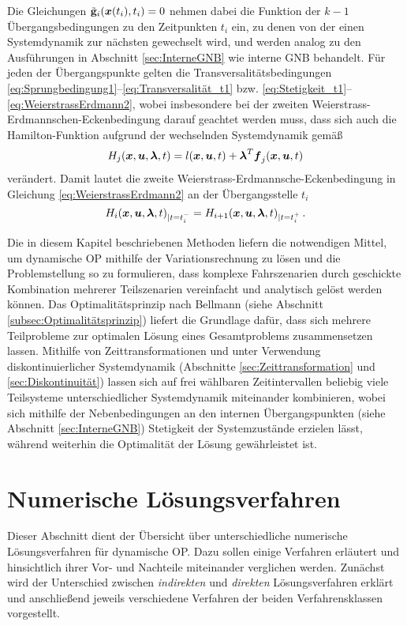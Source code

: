 Die Gleichungen $\tilde{\mathbf{g}}_i(\boldsymbol{x}(t_i),t_i) = 0$ nehmen dabei die Funktion der $k-1$ Übergangsbedingungen zu den Zeitpunkten $t_i$ ein, zu denen von der einen Systemdynamik zur nächsten gewechselt wird, und werden analog zu den Ausführungen in Abschnitt \ref{sec:InterneGNB} wie interne \gls{GNB} behandelt. Für jeden der Übergangspunkte gelten die Transversalitätsbedingungen \eqref{eq:Sprungbedingung1}--\eqref{eq:Transversalität_t1} bzw. \eqref{eq:Stetigkeit_t1}--\eqref{eq:WeierstrassErdmann2}, wobei insbesondere bei der zweiten Weierstrass-Erdmannschen-Eckenbedingung darauf geachtet werden muss, dass sich auch die Hamilton-Funktion aufgrund der wechselnden Systemdynamik gemäß
\begin{equation}
	H_j(\boldsymbol{x},\boldsymbol{u},\boldsymbol{\lambda},t) = l(\boldsymbol{x},\boldsymbol{u},t) + \boldsymbol{\lambda}^T\boldsymbol{f}_j(\boldsymbol{x},\boldsymbol{u},t) \label{eq:Hamilton_j}
\end{equation} 
verändert. Damit lautet die zweite Weierstrass-Erdmannsche-Eckenbedingung in Gleichung \eqref{eq:WeierstrassErdmann2} an der Übergangsstelle $t_i$
\begin{equation}
H_i(\boldsymbol{x},\boldsymbol{u},\boldsymbol{\lambda},t)_{|t=t_i^-} = H_{i+1}(\boldsymbol{x},\boldsymbol{u},\boldsymbol{\lambda},t)_{|t=t_i^+}\,. \label{eq:WeierstrassErdmann2_j}
\end{equation}

Die in diesem Kapitel beschriebenen Methoden liefern die notwendigen Mittel, um dynamische \gls{OP} mithilfe der Variationsrechnung zu lösen und die Problemstellung so zu formulieren, dass komplexe Fahrszenarien durch geschickte Kombination mehrerer Teilszenarien vereinfacht und analytisch gelöst werden können. Das Optimalitätsprinzip nach Bellmann (siehe Abschnitt \ref{subsec:Optimalitätsprinzip}) liefert die Grundlage dafür, dass sich mehrere Teilprobleme zur optimalen Lösung eines Gesamtproblems zusammensetzen lassen. Mithilfe von Zeittransformationen und unter Verwendung diskontinuierlicher Systemdynamik (Abschnitte \ref{sec:Zeittransformation} und \ref{sec:Diskontinuität}) lassen sich auf frei wählbaren Zeitintervallen beliebig viele Teilsysteme unterschiedlicher Systemdynamik miteinander kombinieren, wobei sich mithilfe der Nebenbedingungen an den internen Übergangspunkten (siehe Abschnitt \ref{sec:InterneGNB}) Stetigkeit der Systemzustände erzielen lässt, während weiterhin die Optimalität der Lösung gewährleistet ist.
\section{Numerische Lösungsverfahren}\label{sec:Lösungsverfahren}
Dieser Abschnitt dient der Übersicht über unterschiedliche numerische Lösungsverfahren für dynamische \gls{OP}. Dazu sollen einige Verfahren erläutert und hinsichtlich ihrer Vor- und Nachteile miteinander verglichen werden. Zunächst wird der Unterschied zwischen \textit{indirekten} und \textit{direkten} Lösungsverfahren erklärt und anschließend jeweils verschiedene Verfahren der beiden Verfahrensklassen vorgestellt.
